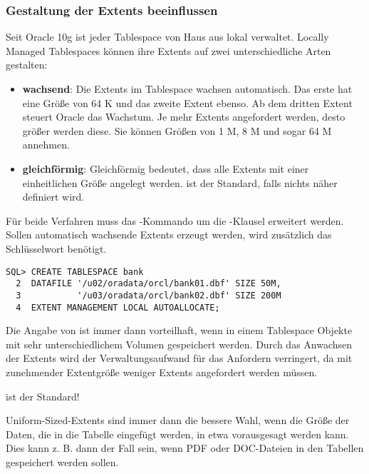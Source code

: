         \subsubsection{Gestaltung der Extents beeinflussen}
          Seit Oracle 10g ist jeder Tablespace von Haus aus lokal verwaltet. Locally Managed Tablespaces k\"onnen ihre Extents auf zwei unterschiedliche Arten gestalten:
          \begin{itemize}
            \item \textbf{wachsend}: Die Extents im Tablespace wachsen automatisch. Das erste hat eine Gr\"o\ss{}e von 64 K und das zweite Extent ebenso. Ab dem dritten Extent steuert Oracle das Wachstum. Je mehr Extents angefordert werden, desto gr\"o\ss{}er werden diese. Sie k\"onnen Gr\"o\ss{}en von 1 M, 8 M und sogar 64 M annehmen.
            \item \textbf{gleichf\"ormig}: Gleichf\"ormig bedeutet, dass alle Extents mit einer einheitlichen Gr\"o\ss{}e angelegt werden.  ist der Standard, falls nichts n\"aher definiert wird.
          \end{itemize}
          F\"ur beide Verfahren muss das -Kommando um die -Klausel erweitert werden. Sollen automatisch wachsende Extents erzeugt werden, wird zus\"atzlich das Schl\"usselwort  ben\"otigt.
          \begin{lstlisting}[caption={Ein Tablespace mit automatisch wachsenden Extents},label=admin105,language=oracle_sql]
SQL> CREATE TABLESPACE bank
  2  DATAFILE '/u02/oradata/orcl/bank01.dbf' SIZE 50M,
  3           '/u03/oradata/orcl/bank02.dbf' SIZE 200M
  4  EXTENT MANAGEMENT LOCAL AUTOALLOCATE;
          \end{lstlisting}
          Die Angabe von  ist immer dann vorteilhaft, wenn in einem Tablespace Objekte mit sehr unterschiedlichem Volumen gespeichert werden. Durch das Anwachsen der Extents wird der Verwaltungsaufwand f\"ur das Anfordern verringert, da mit zunehmender Extentgr\"o\ss{}e weniger Extents angefordert werden m\"ussen.
          \begin{merke}
             ist der Standard!
          \end{merke}
          Uniform-Sized-Extents sind immer dann die bessere Wahl, wenn die Gr\"o\ss{}e der Daten, die in die Tabelle eingef\"ugt werden, in etwa vorausgesagt werden kann. Dies kann z. B. dann der Fall sein, wenn PDF oder DOC-Dateien in den Tabellen gespeichert werden sollen.
